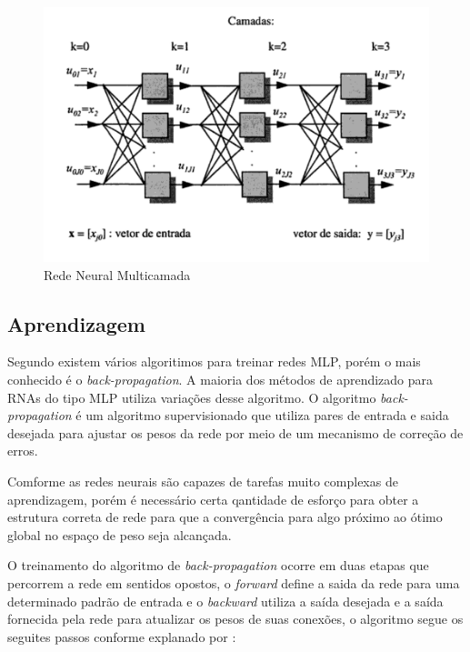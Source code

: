 \documentclass[
	12pt,				%
	openright,			%
	twoside,			%
	a4paper,			%
	english,			%
	french,				%
	spanish,			%
	brazil				%
	]{abntex2}
\begin{document}
\begin{figure}[htb]
	\caption{\label{fig_rede_multicamada}Rede Neural Multicamada}
	\begin{center}
	    \includegraphics[scale=0.5]{imagens/rede_neural_multicamada.pdf}
	\end{center}
\end{figure}


\subsection{Aprendizagem}
Segundo  existem vários algoritimos para treinar redes MLP, porém o mais conhecido é o \emph{back-propagation}. A maioria dos métodos de aprendizado para RNAs do tipo MLP utiliza variações desse algoritmo. O algoritmo \emph{back-propagation} é um algoritmo supervisionado que utiliza pares de entrada e saida desejada para ajustar os pesos da rede por meio de um mecanismo de correção de erros.

Comforme  as redes neurais são capazes de tarefas muito complexas de aprendizagem, porém  é necessário certa qantidade de esforço para obter a estrutura correta de rede para que a convergência para algo próximo ao ótimo global no espaço de peso seja alcançada.

O treinamento do algoritmo de \emph{back-propagation} ocorre em duas etapas que percorrem a rede em sentidos opostos, o \emph{forward} define a saida da rede para uma determinado padrão de entrada e o \emph{backward} utiliza a saída desejada e a saída fornecida pela rede para atualizar os pesos de suas conexões, o algoritmo segue os seguites passos conforme explanado por :
\end{document}
